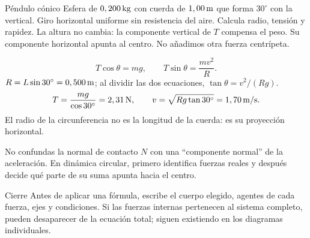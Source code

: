 \documentclass[11pt,a4paper]{article}
\begin{document}
\begin{examplebox}{P\'endulo c\'onico}
 Esfera de $0,200\,\mathrm{kg}$ con cuerda de $1,00\,\mathrm{m}$ que forma $30^\circ$ con la vertical. Giro horizontal uniforme sin resistencia del aire. Calcula radio, tensi\'on y rapidez.
\solutionblock
{} La altura no cambia: la componente vertical de $T$ compensa el peso.
Su componente horizontal apunta al centro. No a\~nadimos otra fuerza centr\'ipeta.
\begin{center}
\end{center}
\[
T\cos\theta=mg,\qquad T\sin\theta=\frac{mv^2}{R}.
\]
 $R=L\sin30^\circ=0,500\,\mathrm{m}$; al dividir las dos
ecuaciones, $\tan\theta=v^2/(Rg)$.
\[
T=\frac{mg}{\cos30^\circ}=2,31\,\mathrm{N},\qquad
v=\sqrt{Rg\tan30^\circ}=1,70\,\mathrm{m/s}.
\]
 El radio de la circunferencia no es la longitud de la cuerda: es su proyecci\'on horizontal.
\end{examplebox}

\begin{warnbox}
No confundas la normal de contacto $N$ con una ``componente normal'' de la aceleraci\'on. En din\'amica circular, primero identifica fuerzas reales y despu\'es decide qu\'e parte de su suma apunta hacia el centro.
\end{warnbox}

\begin{lessoncard}{Cierre}
Antes de aplicar una f\'ormula, escribe el cuerpo elegido, agentes de cada fuerza, ejes y condiciones. Si las fuerzas internas pertenecen al sistema completo, pueden desaparecer de la ecuaci\'on total; siguen existiendo en los diagramas individuales.
\end{lessoncard}
\end{document}
